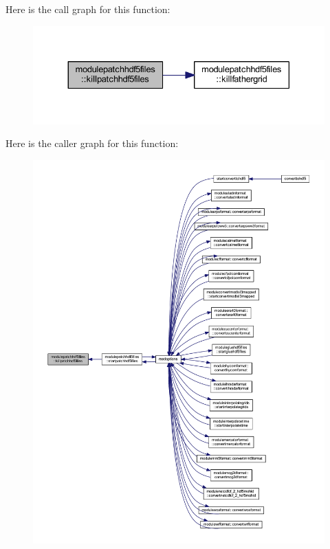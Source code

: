 Here is the call graph for this function\+:\nopagebreak
\begin{figure}[H]
\begin{center}
\leavevmode
\includegraphics[width=330pt]{namespacemodulepatchhdf5files_a28038c83fc0a33bceb0c35f3e9ba08af_cgraph}
\end{center}
\end{figure}
Here is the caller graph for this function\+:\nopagebreak
\begin{figure}[H]
\begin{center}
\leavevmode
\includegraphics[width=350pt]{namespacemodulepatchhdf5files_a28038c83fc0a33bceb0c35f3e9ba08af_icgraph}
\end{center}
\end{figure}
\mbox{\label{namespacemodulepatchhdf5files_ad3c3d3284e4aaad5b2b6c70612fbc40b}} 
